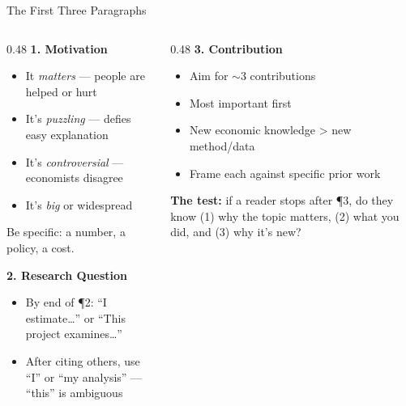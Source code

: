 \begin{frame}{The First Three Paragraphs}
  \footnotesize
  \begin{columns}[T]
    \begin{column}{0.48\textwidth}
      \textbf{\textcolor{usfgreen}{1. Motivation}}
      \begin{itemize}\setlength\itemsep{0pt}
        \item It \emph{matters} --- people are helped or hurt
        \item It's \emph{puzzling} --- defies easy explanation
        \item It's \emph{controversial} --- economists disagree
        \item It's \emph{big} or widespread
      \end{itemize}
      Be specific: a number, a policy, a cost.

      \vspace{3pt}

      \textbf{\textcolor{usfgreen}{2. Research Question}}
      \begin{itemize}\setlength\itemsep{0pt}
        \item By end of \P 2: ``I estimate\ldots'' or ``This project examines\ldots''
        \item After citing others, use ``I'' or ``my analysis'' --- ``this'' is ambiguous
      \end{itemize}
    \end{column}
    \begin{column}{0.48\textwidth}
      \textbf{\textcolor{usfgreen}{3. Contribution}}
      \begin{itemize}\setlength\itemsep{0pt}
        \item Aim for $\sim$3 contributions
        \item Most important first
        \item New economic knowledge > new method/data
        \item Frame each against specific prior work
      \end{itemize}

      \vspace{3pt}

      \textbf{\textcolor{usfgreen}{The test:}} if a reader stops after \P 3, do they know (1) why the topic matters, (2) what you did, and (3) why it's new?
    \end{column}
  \end{columns}
\end{frame}

